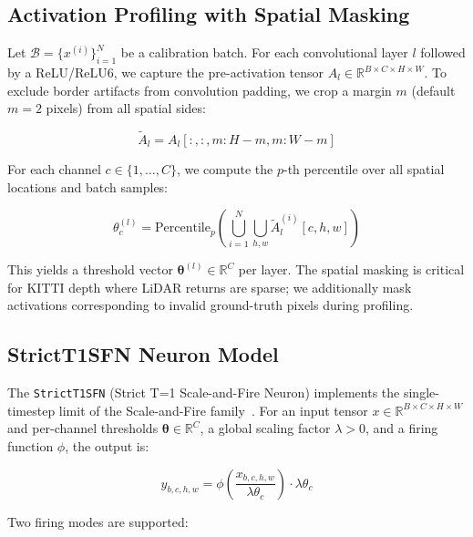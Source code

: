 \documentclass[10pt,conference]{IEEEtran}
\begin{document}
\subsection{Activation Profiling with Spatial Masking}
\label{sec:profiling}

Let $\mathcal{B} = \{x^{(i)}\}_{i=1}^N$ be a calibration batch. For each convolutional layer $l$ followed by a ReLU/ReLU6, we capture the pre-activation tensor $A_l \in \mathbb{R}^{B \times C \times H \times W}$. To exclude border artifacts from convolution padding, we crop a margin $m$ (default $m=2$ pixels) from all spatial sides:

\begin{equation}
    \tilde{A}_l = A_l[:, :, m:H-m, m:W-m]
\end{equation}

For each channel $c \in \{1,\dots,C\}$, we compute the $p$-th percentile over all spatial locations and batch samples:

\begin{equation}
    \theta_c^{(l)} = \text{Percentile}_p\left( \bigcup_{i=1}^N \bigcup_{h,w} \tilde{A}_l^{(i)}[c, h, w] \right)
\end{equation}

This yields a threshold vector $\boldsymbol{\theta}^{(l)} \in \mathbb{R}^C$ per layer. The spatial masking is critical for KITTI depth where LiDAR returns are sparse; we additionally mask activations corresponding to invalid ground-truth pixels during profiling.

\subsection{StrictT1SFN Neuron Model}
\label{sec:strictt1sfn}

The \texttt{StrictT1SFN} (Strict T=1 Scale-and-Fire Neuron) implements the single-timestep limit of the Scale-and-Fire family~\cite{kim2023scale}. For an input tensor $x \in \mathbb{R}^{B \times C \times H \times W}$ and per-channel thresholds $\boldsymbol{\theta} \in \mathbb{R}^C$, a global scaling factor $\lambda > 0$, and a firing function $\phi$, the output is:

\begin{equation}
    y_{b,c,h,w} = \phi\left( \frac{x_{b,c,h,w}}{\lambda \theta_c} \right) \cdot \lambda \theta_c
\end{equation}

Two firing modes are supported:
\end{document}
